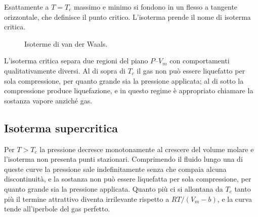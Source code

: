 Esattamente a $T = T_c$ massimo e minimo si fondono in un flesso a tangente orizzontale, che definisce il punto critico. L'isoterma prende il nome di isoterma critica.

\begin{figure}[htbp]
    \centering
    \caption{Isoterme di van der Waals.}
    \label{fig:isotermevdw}
\end{figure}

L'isoterma critica separa due regioni del piano $P$--$V_m$ con comportamenti qualitativamente diversi.
Al di sopra di $T_c$ il gas non può essere liquefatto per sola compressione, per quanto grande sia la pressione applicata; al di sotto la compressione produce liquefazione, e in questo regime è appropriato chiamare la sostanza vapore anziché gas.

\subsection{Isoterma supercritica}

Per $T > T_c$ la pressione decresce monotonamente al crescere del volume molare e l'isoterma non presenta punti stazionari.
Comprimendo il fluido lungo una di queste curve la pressione sale indefinitamente senza che compaia alcuna discontinuità, e la sostanza non può essere liquefatta per sola compressione, per quanto grande sia la pressione applicata.
Quanto più ci si allontana da $T_c$ tanto più il termine attrattivo diventa irrilevante rispetto a $RT/(V_m-b)$, e la curva tende all'iperbole del gas perfetto.

